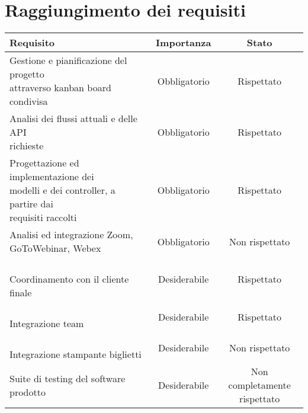 \section{Raggiungimento dei requisiti}

\begin{table}[h]
	\centering
	\label{tab:raggiungimento-obiettivi}
	\begin{tabularx}{\textwidth}{X|c|c}
		\rowcolor{white}
		\textbf{Requisito} & \textbf{Importanza} & \textbf{Stato} \\
		\hline
		\makecell[l]{Gestione e pianificazione del progetto \\ attraverso kanban board condivisa} & Obbligatorio & Rispettato \\
		\makecell[l]{Analisi dei flussi attuali e delle API \\ richieste} & Obbligatorio & Rispettato \\
		\makecell[l]{Progettazione ed implementazione dei \\ modelli e dei controller, a partire dai \\ requisiti raccolti} & Obbligatorio & Rispettato \\
		\makecell[l]{Analisi ed integrazione Zoom, \\ GoToWebinar, Webex} & Obbligatorio & Non rispettato \\
		\makecell[l]{\vspace{-6pt} \\ Coordinamento con il cliente finale \\ \vspace{-6pt}} & Desiderabile & Rispettato \\
		\makecell[l]{\vspace{-6pt} \\ Integrazione team \\ \vspace{-6pt}} & Desiderabile & Rispettato \\
		\makecell[l]{\vspace{-6pt} \\ Integrazione stampante biglietti \\ \vspace{-6pt} } & Desiderabile & Non rispettato \\
		Suite di testing del software prodotto & Desiderabile & \makecell{Non completamente \\ rispettato} \\

\end{tabularx}
\end{table}
